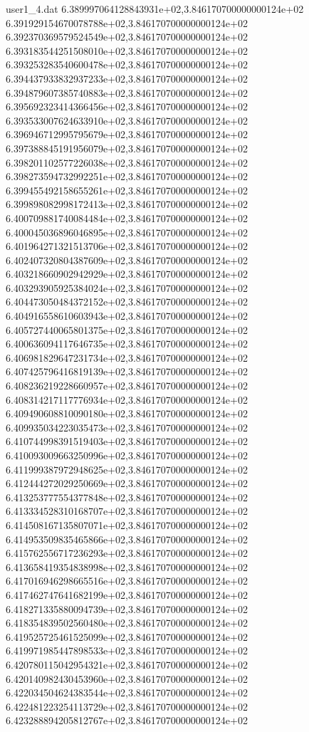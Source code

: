 \begin{filecontents}{user1_4.dat}
6.389997064128843931e+02,3.846170700000000124e+02
6.391929154670078788e+02,3.846170700000000124e+02
6.392370369579524549e+02,3.846170700000000124e+02
6.393183544251508010e+02,3.846170700000000124e+02
6.393253283540600478e+02,3.846170700000000124e+02
6.394437933832937233e+02,3.846170700000000124e+02
6.394879607385740883e+02,3.846170700000000124e+02
6.395692323414366456e+02,3.846170700000000124e+02
6.393533007624633910e+02,3.846170700000000124e+02
6.396946712995795679e+02,3.846170700000000124e+02
6.397388845191956079e+02,3.846170700000000124e+02
6.398201102577226038e+02,3.846170700000000124e+02
6.398273594732992251e+02,3.846170700000000124e+02
6.399455492158655261e+02,3.846170700000000124e+02
6.399898082998172413e+02,3.846170700000000124e+02
6.400709881740084484e+02,3.846170700000000124e+02
6.400045036896046895e+02,3.846170700000000124e+02
6.401964271321513706e+02,3.846170700000000124e+02
6.402407320804387609e+02,3.846170700000000124e+02
6.403218660902942929e+02,3.846170700000000124e+02
6.403293905925384024e+02,3.846170700000000124e+02
6.404473050484372152e+02,3.846170700000000124e+02
6.404916558610603943e+02,3.846170700000000124e+02
6.405727440065801375e+02,3.846170700000000124e+02
6.400636094117646735e+02,3.846170700000000124e+02
6.406981829647231734e+02,3.846170700000000124e+02
6.407425796416819139e+02,3.846170700000000124e+02
6.408236219228660957e+02,3.846170700000000124e+02
6.408314217117776934e+02,3.846170700000000124e+02
6.409490608810090180e+02,3.846170700000000124e+02
6.409935034223035473e+02,3.846170700000000124e+02
6.410744998391519403e+02,3.846170700000000124e+02
6.410093009663250996e+02,3.846170700000000124e+02
6.411999387972948625e+02,3.846170700000000124e+02
6.412444272029250669e+02,3.846170700000000124e+02
6.413253777554377848e+02,3.846170700000000124e+02
6.413334528310168707e+02,3.846170700000000124e+02
6.414508167135807071e+02,3.846170700000000124e+02
6.414953509835465866e+02,3.846170700000000124e+02
6.415762556717236293e+02,3.846170700000000124e+02
6.413658419354838998e+02,3.846170700000000124e+02
6.417016946298665516e+02,3.846170700000000124e+02
6.417462747641682199e+02,3.846170700000000124e+02
6.418271335880094739e+02,3.846170700000000124e+02
6.418354839502560480e+02,3.846170700000000124e+02
6.419525725461525099e+02,3.846170700000000124e+02
6.419971985447898533e+02,3.846170700000000124e+02
6.420780115042954321e+02,3.846170700000000124e+02
6.420140982430453960e+02,3.846170700000000124e+02
6.422034504624383544e+02,3.846170700000000124e+02
6.422481223254113729e+02,3.846170700000000124e+02
6.423288894205812767e+02,3.846170700000000124e+02

\end{filecontents}
